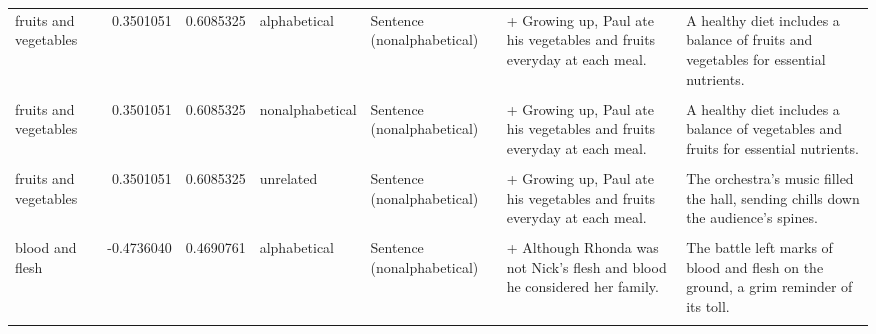 \documentclass[
  12pt,
]{scrartcl}
\begin{document}
\begin{landscape}
\begin{longtable}{lrrllll}
fruits and vegetables & 0.3501051 & 0.6085325 & alphabetical & Sentence (nonalphabetical) & + Growing up, Paul ate his vegetables and fruits everyday at each meal. & A healthy diet includes a balance of fruits and vegetables for essential nutrients.\\
\cellcolor{gray!6}{fruits and vegetables} & \cellcolor{gray!6}{0.3501051} & \cellcolor{gray!6}{0.6085325} & \cellcolor{gray!6}{nonalphabetical} & \cellcolor{gray!6}{Sentence (alphabetical)} & \cellcolor{gray!6}{+ Growing up, Paul ate his fruits and vegetables everyday at each meal.} & \cellcolor{gray!6}{A healthy diet includes a balance of vegetables and fruits for essential nutrients.}\\
fruits and vegetables & 0.3501051 & 0.6085325 & nonalphabetical & Sentence (nonalphabetical) & + Growing up, Paul ate his vegetables and fruits everyday at each meal. & A healthy diet includes a balance of vegetables and fruits for essential nutrients.\\
\addlinespace
\cellcolor{gray!6}{fruits and vegetables} & \cellcolor{gray!6}{0.3501051} & \cellcolor{gray!6}{0.6085325} & \cellcolor{gray!6}{unrelated} & \cellcolor{gray!6}{Sentence (alphabetical)} & \cellcolor{gray!6}{+ Growing up, Paul ate his fruits and vegetables everyday at each meal.} & \cellcolor{gray!6}{The orchestra's music filled the hall, sending chills down the audience's spines.}\\
fruits and vegetables & 0.3501051 & 0.6085325 & unrelated & Sentence (nonalphabetical) & + Growing up, Paul ate his vegetables and fruits everyday at each meal. & The orchestra's music filled the hall, sending chills down the audience's spines.\\
\cellcolor{gray!6}{blood and flesh} & \cellcolor{gray!6}{-0.4736040} & \cellcolor{gray!6}{0.4690761} & \cellcolor{gray!6}{alphabetical} & \cellcolor{gray!6}{Sentence (alphabetical)} & \cellcolor{gray!6}{+ Although Rhonda was not Nick's blood and flesh he considered her family.} & \cellcolor{gray!6}{The battle left marks of blood and flesh on the ground, a grim reminder of its toll.}\\
blood and flesh & -0.4736040 & 0.4690761 & alphabetical & Sentence (nonalphabetical) & + Although Rhonda was not Nick's flesh and blood he considered her family. & The battle left marks of blood and flesh on the ground, a grim reminder of its toll.\\
\cellcolor{gray!6}{blood and flesh} & \cellcolor{gray!6}{-0.4736040} & \cellcolor{gray!6}{0.4690761} & \cellcolor{gray!6}{nonalphabetical} & \cellcolor{gray!6}{Sentence (alphabetical)} & \cellcolor{gray!6}{+ Although Rhonda was not Nick's blood and flesh he considered her family.} & \cellcolor{gray!6}{The battle left marks of flesh and blood on the ground, a grim reminder of its toll.}\\

\end{longtable}
\end{landscape}
\end{document}
